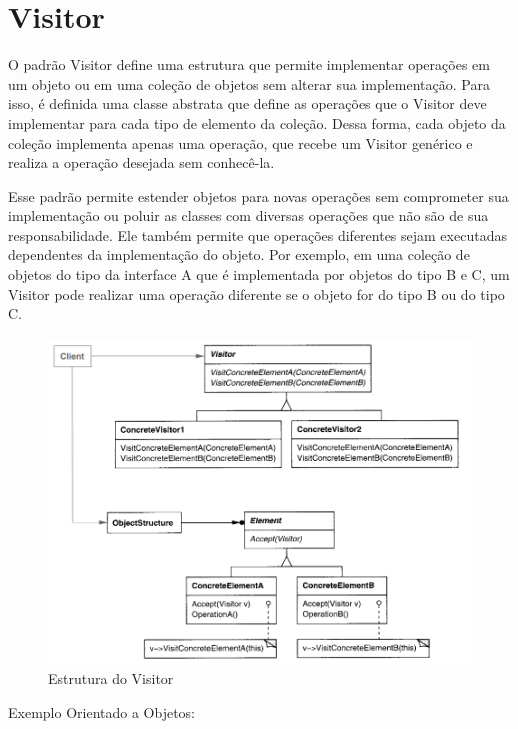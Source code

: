 \section{Visitor}

O padrão Visitor define uma estrutura que permite implementar 
operações em um objeto ou em uma coleção de objetos sem 
alterar sua implementação. Para isso, é definida uma classe 
abstrata que define as operações que o Visitor deve implementar 
para cada tipo de elemento da coleção. Dessa forma, cada 
objeto da coleção implementa apenas uma operação, que recebe 
um Visitor genérico e realiza a operação desejada sem 
conhecê-la.

Esse padrão permite estender objetos para novas operações 
sem comprometer sua implementação ou poluir as classes com 
diversas operações que não são de sua responsabilidade. Ele 
também permite que operações diferentes sejam executadas 
dependentes da implementação do objeto. Por exemplo, em uma 
coleção de objetos do tipo da interface A que é implementada 
por objetos do tipo B e C, um Visitor pode realizar uma 
operação diferente se o objeto for do tipo B ou do tipo C.

\begin{figure}[htb]
	\caption{\label{fig_grafico}Estrutura do Visitor}
	\begin{center}
	    \includegraphics[scale=0.5]{5_padroes-contexto-funcional/5.3_comportamentais/5.3.11_visitor/diagram.png}
	\end{center}
\end{figure}

Exemplo Orientado a Objetos:


